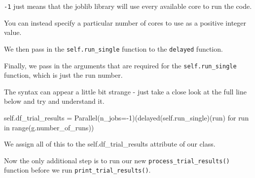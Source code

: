 \documentclass[
  letterpaper,
  DIV=11,
  numbers=noendperiod]{scrreprt}
\newenvironment{Shaded}{\begin{snugshade}}{\end{snugshade}}
\newcommand{\BuiltInTok}[1]{\textcolor[rgb]{0.00,0.23,0.31}{#1}}
\newcommand{\ControlFlowTok}[1]{\textcolor[rgb]{0.00,0.23,0.31}{#1}}
\newcommand{\DecValTok}[1]{\textcolor[rgb]{0.68,0.00,0.00}{#1}}
\newcommand{\KeywordTok}[1]{\textcolor[rgb]{0.00,0.23,0.31}{#1}}
\newcommand{\NormalTok}[1]{\textcolor[rgb]{0.00,0.23,0.31}{#1}}
\newcommand{\OperatorTok}[1]{\textcolor[rgb]{0.37,0.37,0.37}{#1}}
\newcommand{\VariableTok}[1]{\textcolor[rgb]{0.07,0.07,0.07}{#1}}
\begin{document}
\begin{tcolorbox}[enhanced jigsaw, rightrule=.15mm, colback=white, colframe=quarto-callout-tip-color-frame, colbacktitle=quarto-callout-tip-color!10!white, toprule=.15mm, coltitle=black, opacityback=0, titlerule=0mm, bottomtitle=1mm, breakable, title=\textcolor{quarto-callout-tip-color}{\faLightbulb}\hspace{0.5em}{Tip}, opacitybacktitle=0.6, toptitle=1mm, arc=.35mm, bottomrule=.15mm, leftrule=.75mm, left=2mm]

\texttt{-1} just means that the joblib library will use every available
core to run the code.

You can instead specify a particular number of cores to use as a
positive integer value.

\end{tcolorbox}

We then pass in the \texttt{self.run\_single} function to the
\texttt{delayed} function.

Finally, we pass in the arguments that are required for the
\texttt{self.run\_single} function, which is just the run number.

The syntax can appear a little bit strange - just take a close look at
the full line below and try and understand it.

\begin{Shaded}
\begin{Highlighting}[]
\VariableTok{self}\NormalTok{.df\_trial\_results }\OperatorTok{=}\NormalTok{ Parallel(n\_jobs}\OperatorTok{={-}}\DecValTok{1}\NormalTok{)(delayed(}\VariableTok{self}\NormalTok{.run\_single)(run) }\ControlFlowTok{for}\NormalTok{ run }\KeywordTok{in} \BuiltInTok{range}\NormalTok{(g.number\_of\_runs))}
\end{Highlighting}
\end{Shaded}

We assign all of this to the self.df\_trial\_results attribute of our
class.

Now the only additional step is to run our new
\texttt{process\_trial\_results()} function before we run
\texttt{print\_trial\_results()}.
\end{document}
